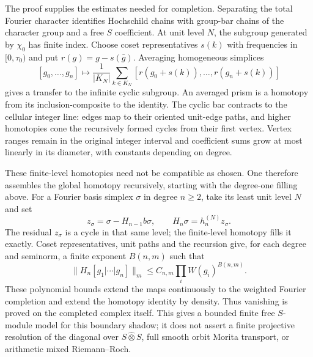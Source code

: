 \documentclass[11pt]{amsart}
\theoremstyle{definition}
\theoremstyle{remark}
\begin{document}
The proof supplies the estimates needed for completion. Separating the
total Fourier character identifies Hochschild chains with group-bar
chains of the character group and a free $S$ coefficient. At unit
level $N$, the subgroup generated by $\chi_0$ has finite index. Choose
coset representatives $s(k)$ with frequencies in $[0,\tau_0)$ and put
$r(g)=g-s(\bar g)$. Averaging homogeneous simplices
\[
 [g_0,\ldots,g_n]\longmapsto
 \frac1{|K_N|}\sum_{k\in K_N}
 [r(g_0+s(k)),\ldots,r(g_n+s(k))]
\]
gives a transfer to the infinite cyclic subgroup. An averaged prism
is a homotopy from its inclusion-composite to the identity. The cyclic
bar contracts to the cellular integer line: edges map to their oriented
unit-edge paths, and higher homotopies cone the recursively formed
cycles from their first vertex. Vertex ranges remain in the original
integer interval and coefficient sums grow at most linearly in its
diameter, with constants depending on degree.

These finite-level homotopies need not be compatible as chosen.
One therefore assembles the global homotopy recursively, starting
with the degree-one filling above. For a Fourier basis simplex
$\sigma$ in degree $n\geq2$, take its least unit level $N$ and set
\[
 z_\sigma=\sigma-H_{n-1}b\sigma,\qquad
 H_n\sigma=h_n^{(N)}z_\sigma.
\]
The residual $z_\sigma$ is a cycle in that same level; the finite-level
homotopy fills it exactly. Coset representatives, unit paths and the
recursion give, for each degree and seminorm, a finite exponent $B(n,m)$
such that
\[
 \|H_n[g_1|\cdots|g_n]\|_m
       \leq C_{n,m}\prod_i W(g_i)^{B(n,m)}.
\]
These polynomial bounds extend the maps continuously to the weighted
Fourier completion and extend the homotopy identity by density.
Thus vanishing is proved on the completed complex itself. This gives a
bounded finite free $S$-module model for this boundary shadow; it does
not assert a finite projective resolution of the diagonal over
$S\widehat\otimes S$, full smooth orbit Morita transport, or arithmetic
mixed Riemann--Roch.
\end{document}
